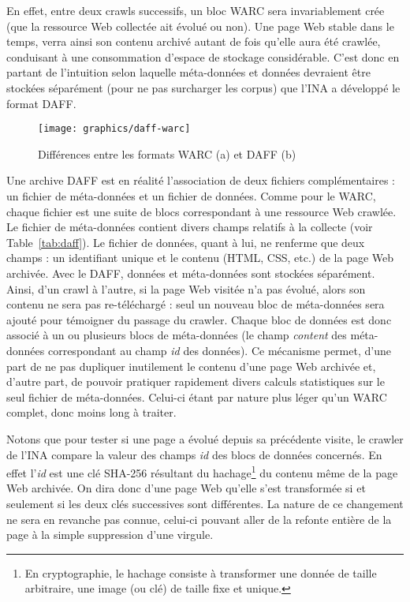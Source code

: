 \documentclass[symmetric,justified,marginals=raggedouter]{tufte-book}
\begin{document}
En effet, entre deux crawls successifs, un bloc WARC sera invariablement crée (que la ressource Web collectée ait évolué ou non). Une page Web stable dans le temps, verra ainsi son contenu archivé autant de fois qu'elle aura été crawlée, conduisant à une consommation d'espace de stockage considérable. C'est donc en partant de l'intuition selon laquelle méta-données et données devraient être stockées séparément (pour ne pas surcharger les corpus) que l'INA a développé le format DAFF.  

\begin{figure*}%
  \texttt{[image: graphics/daff-warc]}
  \caption{Différences entre les formats WARC (a) et DAFF (b)}
  \label{fig:daff-warc}
\end{figure*}

\noindent Une archive DAFF est en réalité l'association de deux fichiers complémentaires : un fichier de méta-données et un fichier de données. Comme pour le WARC, chaque fichier est une suite de blocs correspondant à une ressource Web crawlée. Le fichier de méta-données contient divers champs relatifs à la collecte (voir Table~\ref{tab:daff}). Le fichier de données, quant à lui, ne renferme que deux champs : un identifiant unique et le contenu (HTML, CSS, etc.) de la page Web archivée. Avec le DAFF, données et méta-données sont stockées séparément. Ainsi, d'un crawl à l'autre, si la page Web visitée n'a pas évolué, alors son contenu ne sera pas re-téléchargé : seul un nouveau bloc de méta-données sera ajouté pour témoigner du passage du crawler. Chaque bloc de données est donc associé à un ou plusieurs blocs de méta-données (le champ \textit{content} des méta-données correspondant au champ \textit{id} des données). Ce mécanisme permet, d'une part de ne pas dupliquer inutilement le contenu d'une page Web archivée et, d'autre part, de pouvoir pratiquer rapidement divers calculs statistiques sur le seul fichier de méta-données. Celui-ci étant par nature plus léger qu'un WARC complet, donc moins long à traiter.

Notons que pour tester si une page a évolué depuis sa précédente visite, le crawler de l'INA compare la valeur des champs \textit{id} des blocs de données concernés. En effet l'\textit{id} est une clé SHA-256 résultant du hachage\footnote{\RaggedOuter En cryptographie, le hachage consiste à transformer une donnée de taille arbitraire, une image (ou clé) de taille fixe et unique.} du contenu même de la page Web archivée. On dira donc d'une page Web qu'elle s'est transformée si et seulement si les deux clés successives sont différentes. La nature de ce changement ne sera en revanche pas connue, celui-ci pouvant aller de la refonte entière de la page à la simple suppression d'une virgule.        
\end{document}
